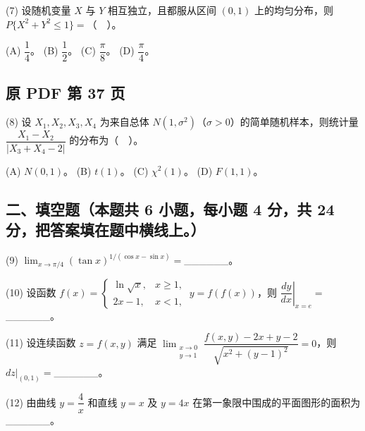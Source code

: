 \documentclass[UTF8,12pt]{ctexart}
\begin{document}
(7) 设随机变量 \(\displaystyle X\) 与 \(\displaystyle Y\) 相互独立，且都服从区间 \(\displaystyle (0,\allowbreak 1)\) 上的均匀分布，则 \(\displaystyle P\{X^2+Y^2\leq1\}=\)（　）。


(A) \(\displaystyle \dfrac{\displaystyle 1}{\displaystyle 4}\)。 (B) \(\displaystyle \dfrac{\displaystyle 1}{\displaystyle 2}\)。 (C) \(\displaystyle \dfrac{\displaystyle \pi}{\displaystyle 8}\)。 (D) \(\displaystyle \dfrac{\displaystyle \pi}{\displaystyle 4}\)。


\clearpage

\subsection*{原 PDF 第 37 页}

(8) 设 \(\displaystyle X_1,\allowbreak X_2,\allowbreak X_3,\allowbreak X_4\) 为来自总体 \(\displaystyle N(1,\allowbreak \sigma^2)\)（\(\displaystyle \sigma>0\)）的简单随机样本，则统计量 \(\displaystyle \dfrac{\displaystyle X_1-X_2}{\displaystyle |X_3+X_4-2|}\) 的分布为（　）。


(A) \(\displaystyle N(0,\allowbreak 1)\)。 (B) \(\displaystyle t(1)\)。 (C) \(\displaystyle \chi^2(1)\)。 (D) \(\displaystyle F(1,\allowbreak 1)\)。


\subsection*{二、填空题（本题共 6 小题，每小题 4 分，共 24 分，把答案填在题中横线上。）}

(9) \(\displaystyle \lim_{x\to\pi/4}(\tan x)^{1/(\cos x-\sin x)}=\)\_\_\_\_\_\_。


(10) 设函数 \(\displaystyle f(x)=\begin{cases}\ln\sqrt x,\allowbreak &x\geq1,\allowbreak \\2x-1,\allowbreak &x<1,\allowbreak \end{cases}\ y=f(f(x))\)，则 \(\displaystyle \left.\dfrac{\displaystyle dy}{\displaystyle dx}\right|_{x=e}=\)\_\_\_\_\_\_。


(11) 设连续函数 \(\displaystyle z=f(x,\allowbreak y)\) 满足 \(\displaystyle \lim_{\substack{x\to0\\y\to1}}\dfrac{\displaystyle f(x,\allowbreak y)-2x+y-2}{\displaystyle \sqrt{x^2+(y-1)^2}}=0\)，则 \(\displaystyle dz|_{(0,\allowbreak 1)}=\)\_\_\_\_\_\_。


(12) 由曲线 \(\displaystyle y=\dfrac{\displaystyle 4}{\displaystyle x}\) 和直线 \(\displaystyle y=x\) 及 \(\displaystyle y=4x\) 在第一象限中围成的平面图形的面积为\_\_\_\_\_\_。
\end{document}
